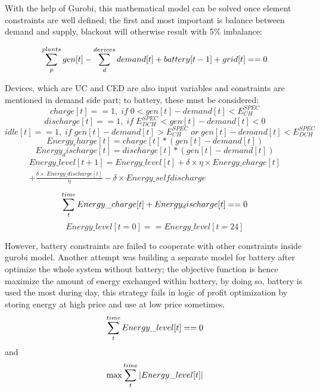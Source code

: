\documentclass[runningheads]{llncs}
\begin{document}
With the help of Gurobi\cite{Gurobi}, this mathematical model can be solved once element constraints are well defined; the first and most important is balance between demand and supply, blackout will otherwise result with 5\% imbalance:\newline

\[\displaystyle \sum_{p}^{\\plants} gen[t] - \sum_{d}^{\\devices} demand[t] + battery[t-1] + grid[t] == 0\]  

Devices, which are UC and CED are also input variables and constraints are mentioned in demand side part; to battery, these must be considered:
\newline
 \[charge[t] == 1, \; if \;0 < gen[t] - demand[t] < E_{CH}^{SPEC}\]
 \newline
 \[discharge[t] == 1, \; if \;E_{DCH}^{SPEC} < gen[t] - demand[t] < 0 \]
 \newline
\[idle[t] == 1, \; if \;gen[t] - demand[t] > E_{CH}^{SPEC} \;or\; gen[t] - demand[t] < E_{DCH}^{SPEC} \]
\newline
\[Energy_charge[t] = charge[t] * (gen[t] - demand[t]) \]
\newline
\[Energy_discharge[t] = discharge[t] * (gen[t] - demand[t]) \]
\newline
\begin{align*}
Energy\_level[t+1] = Energy\_level[t] + \delta \times \eta \times Energy\_charge[t] \\
+ \frac{\delta \times \ Energy\_discharge[t]}{\eta} -\delta \times Energy\_selfdischarge
\end{align*}
\newline
\[\displaystyle \sum_{t}^{\\time} Energy\_charge[t] + Energy_discharge[t] == 0\] 
\newline
\[Energy\_level[t=0] == Energy\_level[t=24] \]
	
However, battery constraints are failed to cooperate with other constraints inside gurobi model. Another attempt was building a separate model for battery after optimize the whole system without battery; the objective function is hence maximize the amount of energy exchanged within battery, by doing so, battery is used the most during day, this strategy fails in logic of profit optimization by storing energy at high price and use at low price sometimes. 
\[\displaystyle \sum_{t}^{\\time} Energy\_level[t] == 0\]
and
\[\displaystyle \max\sum_{t}^{\\time} |Energy\_level[t]|\]
\end{document}
